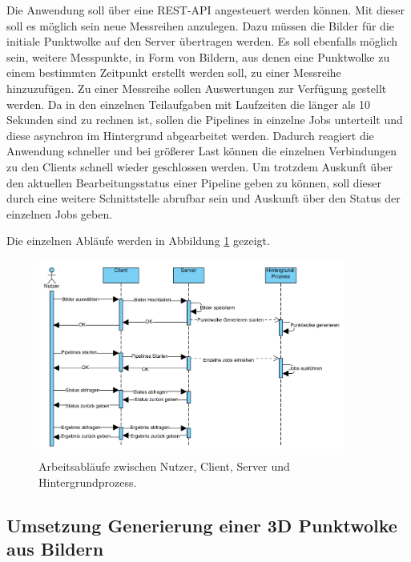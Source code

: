 \documentclass[12pt,titlepage, twoside]{article}
\begin{document}
Die Anwendung soll über eine REST-API angesteuert werden können. Mit dieser soll es möglich sein neue Messreihen anzulegen. Dazu müssen die Bilder für die initiale Punktwolke auf den Server übertragen werden. 
Es soll ebenfalls möglich sein, weitere Messpunkte, in Form von Bildern, aus denen eine Punktwolke zu einem bestimmten Zeitpunkt erstellt werden soll, zu einer Messreihe hinzuzufügen. 
Zu einer Messreihe sollen Auswertungen zur Verfügung gestellt werden. 
Da in den einzelnen Teilaufgaben mit Laufzeiten die länger als 10 Sekunden sind zu rechnen ist, sollen die Pipelines in einzelne Jobs unterteilt und diese asynchron im Hintergrund abgearbeitet werden.
Dadurch reagiert die Anwendung schneller und bei größerer Last können die einzelnen Verbindungen zu den Clients schnell wieder geschlossen werden. 
Um trotzdem Auskunft über den aktuellen Bearbeitungsstatus einer Pipeline geben zu können, soll dieser durch eine weitere Schnittstelle abrufbar sein und Auskunft über den Status der einzelnen Jobs geben.

Die einzelnen Abläufe werden in Abbildung \ref{fig:WorkflowClientServer} gezeigt.

\begin{figure}
    \centering
    \includegraphics[width=0.9\textwidth]{./Images/WorkflowClientServer.png}
    \caption{Arbeitsabläufe zwischen Nutzer, Client, Server und Hintergrundprozess.}
    \label{fig:WorkflowClientServer}
\end{figure}

\subsection{Umsetzung Generierung einer 3D Punktwolke aus Bildern}
\label{sec:realisierung:implementierung1}
\end{document}
